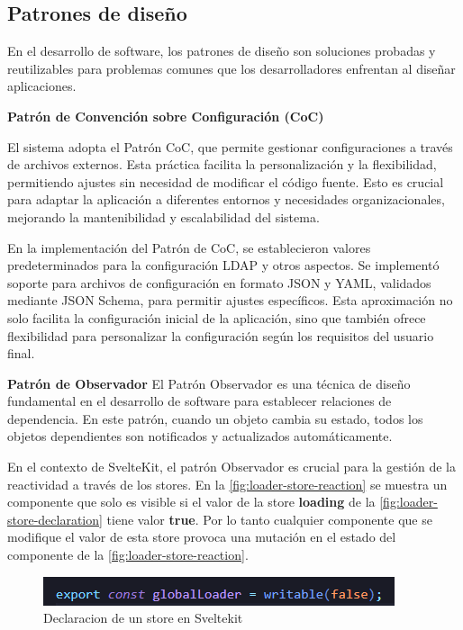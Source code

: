 \subsection{Patrones de diseño}

En el desarrollo de software, los patrones de diseño son soluciones probadas y reutilizables para problemas comunes que los desarrolladores enfrentan al diseñar aplicaciones.

\textbf{Patrón de Convención sobre Configuración (CoC)}

El sistema adopta el Patrón CoC, que permite gestionar configuraciones a través de archivos externos. Esta práctica facilita la personalización y la flexibilidad, permitiendo ajustes sin necesidad de modificar el código fuente. Esto es crucial para adaptar la aplicación a diferentes entornos y necesidades organizacionales, mejorando la mantenibilidad y escalabilidad del sistema.

En la implementación del Patrón de CoC, se establecieron valores predeterminados para la configuración LDAP y otros aspectos. Se implementó soporte para archivos de configuración en formato JSON y YAML, validados mediante JSON Schema, para permitir ajustes específicos. Esta aproximación no solo facilita la configuración inicial de la aplicación, sino que también ofrece flexibilidad para personalizar la configuración según los requisitos del usuario final.

\textbf{Patrón de Observador}
El Patrón Observador es una técnica de diseño fundamental en el desarrollo de software para establecer relaciones de dependencia. En este patrón, cuando un objeto cambia su estado, todos los objetos dependientes son notificados y actualizados automáticamente.

En el contexto de SvelteKit, el patrón Observador es crucial para la gestión de la reactividad a través de los stores. En la \autoref{fig:loader-store-reaction} se muestra un componente que solo es visible si el valor de la store \textbf{loading} de la \autoref{fig:loader-store-declaration} tiene valor \textbf{true}. Por lo tanto cualquier componente que se modifique el valor de esta store provoca una mutación en el estado del componente de la \autoref{fig:loader-store-reaction}.

\begin{figure}[h]
    \centering
    \includegraphics[width=\linewidth]{images/code/loader-store-declaration.png}
    \caption{Declaracion de un store en Sveltekit}
    \label{fig:loader-store-declaration}
\end{figure}

